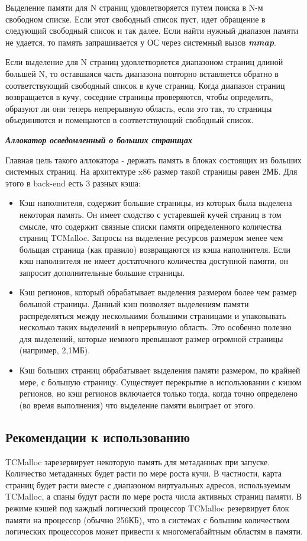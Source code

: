 Выделение памяти для N страниц удовлетворяется путем поиска в N-м свободном списке. Если этот свободный список пуст, идет обращение в следующий свободный список и так далее. Если найти нужный диапазон памяти не удается, то память запрашивается у ОС через системный вызов \textbf{\textit{mmap}}.

Если выделение для N страниц удовлетворяется диапазоном страниц длиной большей N, то оставшаяся часть диапазона повторно вставляется обратно в соответствующий свободный список в куче страниц. Когда диапазон страниц возвращается в кучу, соседние страницы проверяются, чтобы определить, образуют ли они теперь непрерывную область, если это так, то страницы объединяются и помещаются в соответствующий свободный список.

\bigbreak
\textit{\textbf{Аллокатор осведомленный о больших страницах}}

Главная цель такого аллокатора - держать память в блоках состоящих из больших системных страниц. На архитектуре x86 размер такой страницы равен 2МБ. Для этого в back-end есть 3 разных кэша:
\begin{itemize}
	\item Кэш наполнителя, содержит большие страницы, из которых была выделена некоторая память. Он имеет сходство с устаревшей кучей страниц в том смысле, что содержит связные списки памяти определенного количества страниц TCMalloc. Запросы на выделение ресурсов размером менее чем больщая страница (как правило) возвращаются из кэша наполнителя. Если кэш наполнителя не имеет достаточного количества доступной памяти, он запросит дополнительные большие страницы.
	\item Кэш регионов, который обрабатывает выделения размером более чем размер большой страницы. Данный кэш позволяет выделениям памяти распределяться между несколькими большими страницами и упаковывать несколько таких выделений в непрерывную область. Это особенно полезно для выделений, которые немного превышают размер огромной страницы (например, 2,1МБ).
	\item Кэш больших страниц обрабатывает выделения памяти размером, по крайней мере, с большую страницу. Существует перекрытие в использовании с кэшом регионов, но кэш регионов включается только тогда, когда точно определено (во время выполнения) что выделение памяти выиграет от этого.
\end{itemize}

\subsection{Рекомендации к использованию}
TCMalloc зарезервирует некоторую память для метаданных при запуске. Количество метаданных будет расти по мере роста кучи. В частности, карта страниц будет расти вместе с диапазоном виртуальных адресов, используемым TCMalloc, а спаны будут расти по мере роста числа активных страниц памяти. В режиме кэшей под каждый логический процессор TCMalloc резервирует блок памяти на процессор (обычно 256КБ), что в системах с большим количеством логических процессоров может привести к многомегабайтным областям в памяти.

